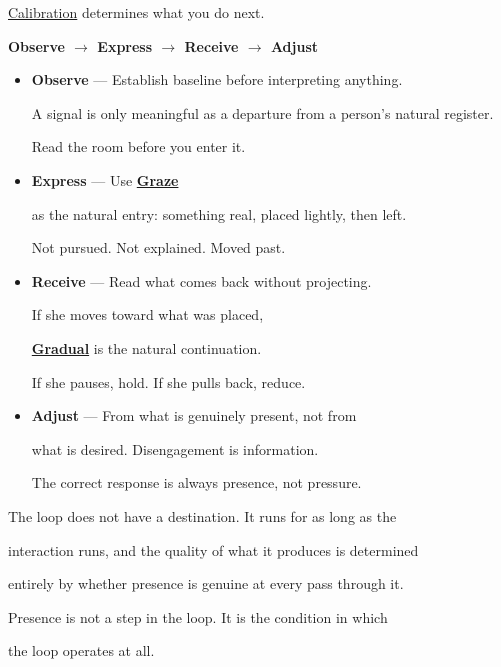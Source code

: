 \documentclass[12pt, a4paper]{article}
\begin{document}
\hyperref[subsec:calibration_loop]{Calibration} determines what you do next.

\begin{center}

\textbf{Observe $\rightarrow$ Express $\rightarrow$ Receive $\rightarrow$ Adjust}

\end{center}

\begin{itemize}

\item \textbf{Observe} --- Establish baseline before interpreting anything.

A signal is only meaningful as a departure from a person's natural register.

Read the room before you enter it.

\item \textbf{Express} --- Use \hyperref[subsec:three_modes]{\textbf{Graze}}

as the natural entry: something real, placed lightly, then left.

Not pursued. Not explained. Moved past.

\item \textbf{Receive} --- Read what comes back without projecting.

If she moves toward what was placed,

\hyperref[subsec:three_modes]{\textbf{Gradual}} is the natural continuation.

If she pauses, hold. If she pulls back, reduce.

\item \textbf{Adjust} --- From what is genuinely present, not from

what is desired. Disengagement is information.

The correct response is always presence, not pressure.

\end{itemize}

The loop does not have a destination. It runs for as long as the

interaction runs, and the quality of what it produces is determined

entirely by whether presence is genuine at every pass through it.

Presence is not a step in the loop. It is the condition in which

the loop operates at all.

\end{document}
